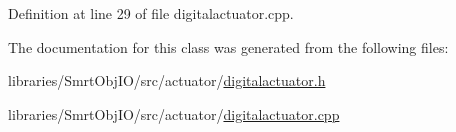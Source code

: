 Definition at line 29 of file digitalactuator.\+cpp.



The documentation for this class was generated from the following files\+:\begin{DoxyCompactItemize}
\item 
libraries/\+Smrt\+Obj\+I\+O/src/actuator/\hyperlink{digitalactuator_8h}{digitalactuator.\+h}\item 
libraries/\+Smrt\+Obj\+I\+O/src/actuator/\hyperlink{digitalactuator_8cpp}{digitalactuator.\+cpp}\end{DoxyCompactItemize}
